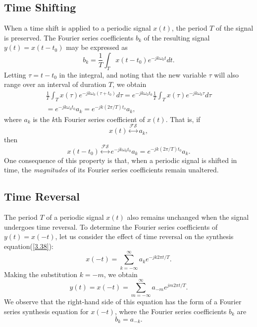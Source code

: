 \documentclass[a4paper,twoside]{book}
\begin{document}
\subsection{Time Shifting}

When a time shift is applied to a periodic signal $x(t)$, the period $T$ of the signal is preserved. The Fourier series coefficients $b_k$ of the resulting signal $y(t)=x(t-t_0)$ may be expressed as
\begin{equation}
    b_k = \frac{1}{T}\int_Tx(t-t_0)e^{-jk\omega_0t}dt.
    \label{3.59}
\end{equation}
Letting $\tau=t-t_0$ in the integral, and noting that the new variable $\tau$ will also range over an interval of duration $T$, we obtain
\begin{equation}
    \begin{aligned}\frac{1}{T}\int_{T}x(\tau)e^{-jk\omega_{0}(\tau+t_{0})}d\tau=e^{-jk\omega_{0}t_{0}}\frac{1}{T}\int_{T}x(\tau)e^{-jk\omega_{0}\tau}d\tau\\=e^{-jk\omega_{0}t_{0}}a_{k}=e^{-jk(2\pi/T)t_{o}}a_{k},\end{aligned}
    \label{3.60}
\end{equation}
where $a_k$ is the $k$th Fourier series coefficient of $x(t)$. That is, if $$x(t)\overset{\mathcal{FS}}{\longleftrightarrow}a_k,$$ then $$x(t-t_0)\overset{\mathcal{FS}}{\longleftrightarrow}e^{-jk\omega_0t_0}a_k=e^{-jk(2\pi/T)t_0}a_k.$$ One consequence of this property is that, when a periodic signal is shifted in time, the \textit{magnitudes} of its Fourier series coefficients remain unaltered.

\subsection{Time Reversal}

The period $T$ of a periodic signal $x(t)$ also remains unchanged when the signal undergoes time reversal. To determine the Fourier series coefficients of $y(t)=x(-t)$, let us consider the effect of time reversal on the synthesis equation\;(\ref{3.38}):
\begin{equation}
    x(-t) = \sum_{k=-\infty}^{\infty}a_{k}e^{-j k2\pi t/T}.
    \label{3.61}
\end{equation}
Making the substitution $k=-m$, we obtain
\begin{equation}
    y(t) = x(-t) = \sum_{m=-\infty}^{\infty}a_{-m}e^{jm2\pi t/T}.
    \label{3.62}
\end{equation}
We observe that the right-hand side of this equation has the form of a Fourier series synthesis equation for $x(-t)$, where the Fourier series coefficients $b_k$ are
\begin{equation}
    b_k=a_{-k}.
    \label{3.63}
\end{equation}
\end{document}
